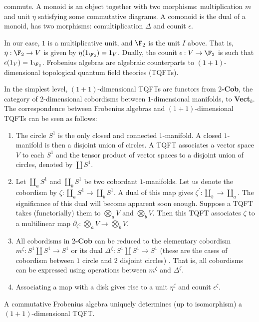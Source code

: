 commute. A monoid is an object together with two morphisms: multiplication $m$ and unit $\eta$ satisfying some commutative diagrams. A comonoid is the dual of a monoid, has two morphisms: comultiplication $\Delta$ and counit $\epsilon$.

In our case, $1$ is a multiplicative unit, and $\F_2$ is the unit $I$ above. That is, $\eta: \F_2 \to V$ is given by $\eta(1_{\F_2}) = 1_V$. Dually, the counit $\epsilon: V \to \F_2$ is such that $\epsilon(1_V) = 1_{\F_2}$. Frobenius algebras are algebraic counterparts to $(1+1)$-dimensional topological quantum field theories (TQFTs).

In the simplest level, $(1+1)$-dimensional TQFTs are functors from \textbf{$2$-Cob}, the category of 2-dimensional cobordisms between $1$-dimensional manifolds, to \textbf{Vect$_k$}. The correspondence between Frobenius algebras and $(1+1)$-dimensional TQFTs can be seen as follows: 
\begin{enumerate}
\item\label{item:3} The circle $S^1$ is the only closed and connected $1$-manifold. A closed $1$-manifold is then a disjoint union of circles. A TQFT associates a vector space $V$ to each $S^1$ and the tensor product of vector spaces to a disjoint union of circles, denoted by $\coprod S^1$. 
\item\label{item:4} Let $\coprod_a S^1$ and $\coprod_b S^1$ be two cobordant $1$-manifolds. Let us denote the cobordism by $\zeta: \coprod_a S^1 \to \coprod_b S^1$. A dual of this map gives $\zeta^{\prime}: \coprod_b \to \coprod_a$. The significance of this dual will become apparent soon enough. Suppose a TQFT takes (functorially) them to $\bigotimes_a V$ and $\bigotimes_b V$. Then this TQFT associates $\zeta$ to a multilinear map $\partial_{\zeta} : \bigotimes_a V \to \bigotimes_b V$. 
\item\label{item:5} All cobordisms in \textbf{$2$-Cob} can be reduced to the elementary cobordism $m^{\zeta}: S^1 \coprod S^1 \to S^1$ or its dual $\Delta^{\zeta}: S^1 \coprod S^1 \to S^1$ (these are the cases of cobordism between $1$ circle and $2$ disjoint circles) . That is, all cobordisms can be expressed using operations between $m^{\zeta}$ and $\Delta^{\zeta}$. 
\item\label{item:6} Associating a map with a disk gives rise to a unit $\eta^{\zeta}$ and counit $\epsilon^{\zeta}$.
\end{enumerate}

\begin{theorem}
\label{sec:cohom-groups-mathc-14}
A commutative Frobenius algebra uniquely determines (up to isomorphism) a $(1+1)$-dimensional TQFT.
\end{theorem}

